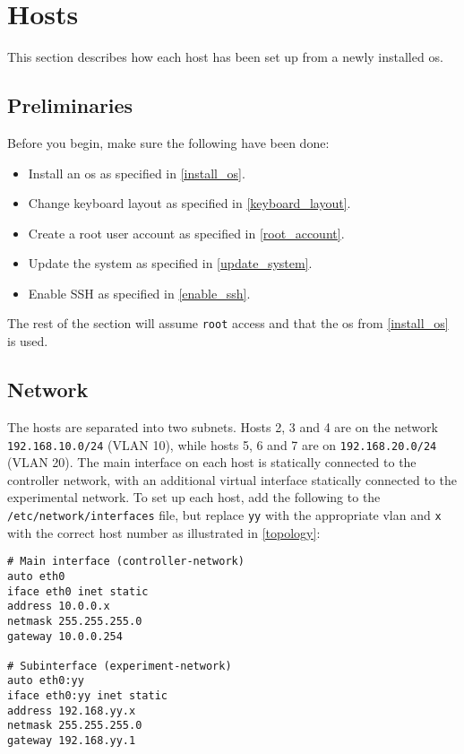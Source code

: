 \chapter{Hosts}

This section describes how each host has been set up from a newly installed \gls{os}.

\section{Preliminaries}

Before you begin, make sure the following have been done:

\begin{itemize}
    \item Install an \gls{os} as specified in \ref{install_os}.
    \item Change keyboard layout as specified in \ref{keyboard_layout}.
    \item Create a root user account as specified in \ref{root_account}.
    \item Update the system as specified in \ref{update_system}.
    \item Enable SSH as specified in \ref{enable_ssh}.
\end{itemize}

The rest of the section will assume \lstinline{root} access and that the \gls{os} from \ref{install_os} is used.


\section{Network}

The hosts are separated into two subnets. Hosts 2, 3 and 4 are on the network \lstinline{192.168.10.0/24} (VLAN 10), while hosts 5, 6 and 7 are on \lstinline{192.168.20.0/24} (VLAN 20). The main interface on each host is statically connected to the controller network, with an additional virtual interface statically connected to the experimental network. To set up each host, add the following to the \lstinline{/etc/network/interfaces} file, but replace \lstinline{yy} with the appropriate \gls{vlan} and \lstinline{x} with the correct host number as illustrated in \ref{topology}:

\begin{lstlisting}
# Main interface (controller-network)
auto eth0
iface eth0 inet static
address 10.0.0.x
netmask 255.255.255.0
gateway 10.0.0.254

# Subinterface (experiment-network)
auto eth0:yy
iface eth0:yy inet static
address 192.168.yy.x
netmask 255.255.255.0
gateway 192.168.yy.1
\end{lstlisting}


